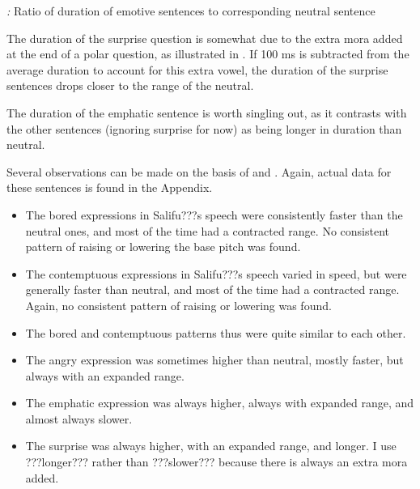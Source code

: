 \documentclass[output=paper]{langsci/langscibook}
\begin{document}





\emph{\textup{:}} Ratio of duration of emotive sentences to corresponding neutral sentence

The duration of the surprise question is somewhat due to the extra mora added at the end of a polar question, as illustrated in . If 100 ms is subtracted from the average duration to account for this extra vowel, the duration of the surprise sentences drops closer to the range of the neutral. 

The duration of the emphatic sentence is worth singling out, as it contrasts with the other sentences (ignoring surprise for now) as being longer in duration than neutral. 

Several observations can be made on the basis of  and . Again, actual data for these sentences is found in the Appendix.

\begin{itemize}
\item The bored expressions in Salifu???s speech were consistently faster than the neutral ones, and most of the time had a contracted range. No consistent pattern of raising or lowering the base pitch was found.
\item The contemptuous expressions in Salifu???s speech varied in speed, but were generally faster than neutral, and most of the time had a contracted range. Again, no consistent pattern of raising or lowering was found.
\item The bored and contemptuous patterns thus were quite similar to each other.
\item The angry expression was sometimes higher than neutral, mostly faster, but always with an expanded range.
\item The emphatic expression was always higher, always with expanded range, and almost always slower.
\item The surprise was always higher, with an expanded range, and longer. I use ???longer??? rather than ???slower??? because there is always an extra mora added.
\end{itemize}
\end{document}
